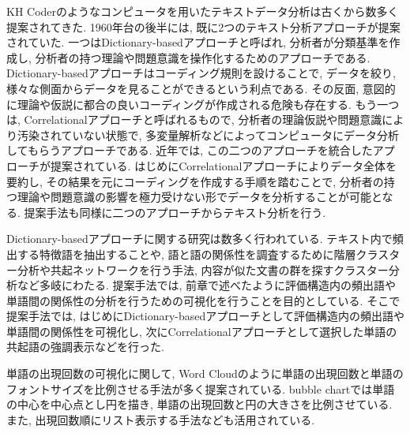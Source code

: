 \documentclass[syuuron]{kuee}
\begin{document}
		KH Coderのようなコンピュータを用いたテキストデータ分析は古くから数多く提案されてきた. 
		1960年台の後半には, 既に2つのテキスト分析アプローチが提案されていた. 
		一つはDictionary-basedアプローチと呼ばれ, 分析者が分類基準を作成し, 
		分析者の持つ理論や問題意識を操作化するためのアプローチである. 
		Dictionary-basedアプローチはコーディング規則を設けることで, データを絞り, 様々な側面からデータを見ることができるという利点である. 
		その反面, 意図的に理論や仮説に都合の良いコーディングが作成される危険も存在する. 
		もう一つは, Correlationalアプローチと呼ばれるもので, 分析者の理論仮説や問題意識により汚染されていない状態で, 
		多変量解析などによってコンピュータにデータ分析してもらうアプローチである. 
		近年では, この二つのアプローチを統合したアプローチが提案されている\cite{kh1, kh2}. 
		はじめにCorrelationalアプローチによりデータ全体を要約し, その結果を元にコーディングを作成する手順を踏むことで, 
		分析者の持つ理論や問題意識の影響を極力受けない形でデータを分析することが可能となる. 
		提案手法も同様に二つのアプローチからテキスト分析を行う. 
		
		Dictionary-basedアプローチに関する研究は数多く行われている. 
		テキスト内で頻出する特徴語を抽出することや, 語と語の関係性を調査するために階層クラスター分析や共起ネットワークを行う手法, 
		内容が似た文書の群を探すクラスター分析など多岐にわたる. 
		提案手法では, 前章で述べたように評価構造内の頻出語や単語間の関係性の分析を行うための可視化を行うことを目的としている. 
		そこで提案手法では, はじめにDictionary-basedアプローチとして評価構造内の頻出語や単語間の関係性を可視化し, 
		次にCorrelationalアプローチとして選択した単語の共起語の強調表示などを行った. 
		
		単語の出現回数の可視化に関して, Word Cloudのように単語の出現回数と単語のフォントサイズを比例させる手法が多く提案されている\cite{wc1}. 
		bubble chartでは単語の中心を中心点とし円を描き, 単語の出現回数と円の大きさを比例させている. 
		また, 出現回数順にリスト表示する手法なども活用されている. 
		
\end{document}
